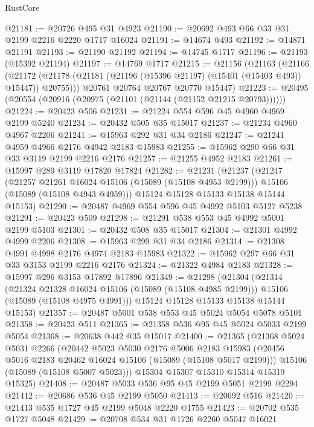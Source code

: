 \begin{lexlean}{RustCore}
\begin{coremodule}
@21181 := @20726 @495 @31 @4923
@21190 := @20692 @493 @66 @33 @31 @2199 @2216 @2220 @1717 @16024
@21191 := @14674 @493
@21192 := @14871 @21191
@21193 := @21190 @21192
@21194 := @14745 @1717
@21196 := @21193 (@15392 @21194)
@21197 := @14769 @1717
@21215 := @21156
    (@21163
      (@21166
        (@21172 (@21178 (@21181 (@21196 (@15396 @21197) (@15401 (@15403 @493)) @15447)) @20755)))
      @20761
      @20764
      @20767
      @20770
      @15447)
@21223 := @20495 (@20554 (@20916 (@20975 (@21101 (@21144 (@21152 @21215 @20793))))))
@21224 := @20423 @506
@21231 := @21224 @554 @596 @45 @4960 @4969 @2199 @5240
@21234 := @20432 @505 @35 @15017
@21237 := @21234 @4960 @4967 @2206
@21241 := @15963 @292 @31 @34 @2186
@21247 := @21241 @4959 @4966 @2176 @4942 @2183 @15983
@21255 := @15962 @290 @66 @31 @33 @3119 @2199 @2216 @2176
@21257 := @21255 @4952 @2183
@21261 := @15997 @289 @3119 @17820 @17824
@21282 := @21231
    (@21237
      (@21247
        (@21257 @21261 @16024 @15106 (@15089 (@15108 @4953 @2199)))
        @15106
        (@15089 (@15108 @4943 @4959)))
      @15124
      @15128
      @15133
      @15138
      @15144
      @15153)
@21290 := @20487 @4969 @554 @596 @45 @4992 @5103 @5127 @5238
@21291 := @20423 @509
@21298 := @21291 @538 @553 @45 @4992 @5001 @2199 @5103
@21301 := @20432 @508 @35 @15017
@21304 := @21301 @4992 @4999 @2206
@21308 := @15963 @299 @31 @34 @2186
@21314 := @21308 @4991 @4998 @2176 @4974 @2183 @15983
@21322 := @15962 @297 @66 @31 @33 @3153 @2199 @2216 @2176
@21324 := @21322 @4984 @2183
@21328 := @15997 @296 @3153 @17892 @17896
@21349 := @21298
    (@21304
      (@21314
        (@21324 @21328 @16024 @15106 (@15089 (@15108 @4985 @2199)))
        @15106
        (@15089 (@15108 @4975 @4991)))
      @15124
      @15128
      @15133
      @15138
      @15144
      @15153)
@21357 := @20487 @5001 @538 @553 @45 @5024 @5054 @5078 @5101
@21358 := @20423 @511
@21365 := @21358 @536 @95 @45 @5024 @5033 @2199 @5054
@21368 := @20638 @442 @35 @15017
@21400 := @21365
    (@21368
      @5024
      @5031
      @2266
      (@20442
        @5023
        @5030
        @2176
        @5006
        @2183
        @15983
        (@20456 @5016 @2183 @20462 @16024 @15106 (@15089 (@15108 @5017 @2199)))
        @15106
        (@15089 (@15108 @5007 @5023)))
      @15304
      @15307
      @15310
      @15314
      @15319
      @15325)
@21408 := @20487 @5033 @536 @95 @45 @2199 @5051 @2199 @2294
@21412 := @20686 @536 @45 @2199 @5050
@21413 := @20692 @516
@21420 := @21413 @535 @1727 @45 @2199 @5048 @2220 @1755
@21423 := @20702 @535 @1727 @5048
@21429 := @20708 @534 @31 @1726 @2260 @5047 @16021

\end{coremodule}
\end{lexlean}
